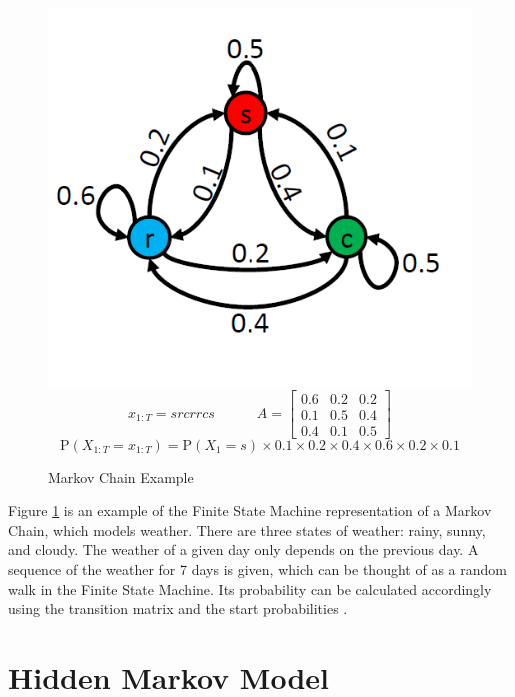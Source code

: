 \begin{figure}
    \centering
   \includegraphics{figures/markov-chain.png}
$$x_{1: T}=s r  c r r c s \quad\quad\quad A= \left[\begin{array}{lll}
0.6 & 0.2 & 0.2 \\
0.1 & 0.5 & 0.4 \\
0.4 & 0.1 & 0.5
\end{array}\right]$$
$$\mathrm{P}\left(X_{1: T}=x_{1: T}\right)=\mathrm{P}\left(X_{1}=s\right) \times 0.1 \times 0.2 \times 0.4 \times 0.6 \times 0.2 \times 0.1$$
\caption{Markov Chain Example}    
\label{fig:markov-chain-example}
\end{figure}

Figure \ref{fig:markov-chain-example} is an example of the Finite State Machine representation of a Markov Chain, which models weather. There are  three states of weather: rainy, sunny, and cloudy. The weather of a given day only depends on the previous day. A sequence of the weather for 7 days is given, which can be thought of as a random walk in the Finite State Machine.  Its probability can be calculated accordingly using the transition matrix and the start probabilities \parencite{miningmassivedatasets}.

\section{Hidden Markov Model}


